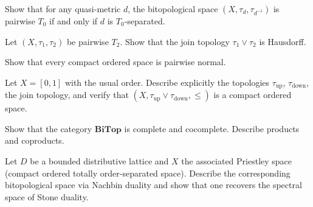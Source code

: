 \begin{exercise}
Show that for any quasi-metric $d$, the bitopological space $(X,\tau_d,\tau_{d^{-1}})$ is
pairwise $T_0$ if and only if $d$ is $T_0$-separated.
\end{exercise}

\begin{exercise}
Let $(X,\tau_1,\tau_2)$ be pairwise $T_2$. Show that the join topology $\tau_1 \vee \tau_2$
is Hausdorff.
\end{exercise}

\begin{exercise}
Show that every compact ordered space is pairwise normal.
\end{exercise}

\begin{exercise}
Let $X = [0,1]$ with the usual order. Describe explicitly the topologies
$\tau_{\mathrm{up}}$, $\tau_{\mathrm{down}}$, the join topology, and verify that
$(X, \tau_{\mathrm{up}} \vee \tau_{\mathrm{down}}, \leq)$ is a compact ordered space.
\end{exercise}

\begin{exercise}
Show that the category $\mathbf{BiTop}$ is complete and cocomplete. Describe products and
coproducts.
\end{exercise}

\begin{exercise}
Let $D$ be a bounded distributive lattice and $X$ the associated Priestley space (compact
ordered totally order-separated space). Describe the corresponding bitopological space via
Nachbin duality and show that one recovers the spectral space of Stone duality.
\end{exercise}
